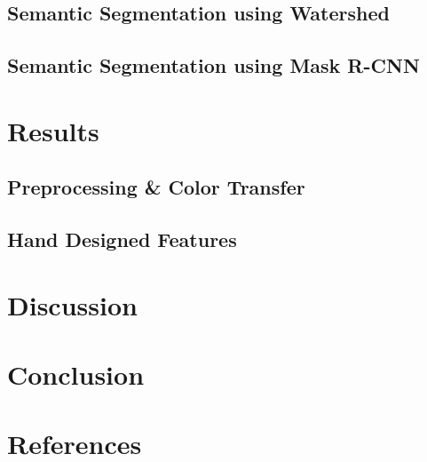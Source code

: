 \documentclass[paper=letter, fontsize=12pt]{article}
\numberwithin{equation}{section} %
\numberwithin{figure}{section} %
\numberwithin{table}{section} %
\begin{document}
\subsection{Semantic Segmentation using Watershed}

\subsection{Semantic Segmentation using Mask R-CNN}

\section{Results}

\subsection{Preprocessing \& Color Transfer}

\subsection{Hand Designed Features}

\section{Discussion}

\section{Conclusion}

\section{References}

\printbibliography
\end{document}
